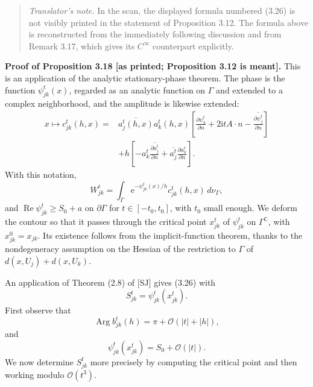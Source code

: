 \documentclass[11pt]{article}
\newcommand{\C}{\mathbb{C}}
\newcommand{\Ree}{\operatorname{Re}}
\newcommand{\Argg}{\operatorname{Arg}}
\newcommand{\OO}{\mathcal O}
\newcommand{\dd}{\,d}
\newcommand{\ii}{\mathrm{i}}
\newcommand{\e}{\mathrm{e}}
\begin{document}
\begin{quote}\small
\textit{Translator's note.} In the scan, the displayed formula numbered (3.26) is not visibly printed in the statement of Proposition 3.12. The formula above is reconstructed from the immediately following discussion and from Remark 3.17, which gives its $C^\infty$ counterpart explicitly.
\end{quote}

\noindent\textbf{Proof of Proposition 3.18 [as printed; Proposition 3.12 is meant].}
This is an application of the analytic stationary-phase theorem. The phase is the function $\psi_{jk}^t(x)$, regarded as an analytic function on $\Gamma$ and extended to a complex neighborhood, and the amplitude is likewise extended:
\begin{align*}
x\longmapsto c_{jk}^t(h,x)
={}&\overline{a_j^t(h,x)}a_k^t(h,x)
\left[
\frac{\partial\psi_k^t}{\partial n}
+2\ii tA\cdot n
-\overline{\frac{\partial\psi_j^t}{\partial n}}
\right]\\
&+h\left[-a_k^t\overline{\frac{\partial a_j^t}{\partial n}}
+\overline{a_j^t}\frac{\partial a_k^t}{\partial n}\right].
\end{align*}
With this notation,
\[
W_{jk}^t=\int_\Gamma \e^{-\psi_{jk}^t(x)/h}
 c_{jk}^t(h,x)\dd\nu_\Gamma,
\]
and $\Ree\psi_{jk}^t\ge S_0+a$ on $\partial\Gamma$ for $t\in[-t_0,t_0]$, with $t_0$ small enough. We deform the contour so that it passes through the critical point $x_{jk}^t$ of $\psi_{jk}^t$ on $\Gamma^{\C}$, with $x_{jk}^0=x_{jk}$. Its existence follows from the implicit-function theorem, thanks to the nondegeneracy assumption on the Hessian of the restriction to $\Gamma$ of
$d(x,U_j)+d(x,U_k)$.

An application of Theorem (2.8) of [SJ] gives (3.26) with
\begin{equation}
S_{jk}^t=\psi_{jk}^t(x_{jk}^t).
\tag{3.27}
\end{equation}
First observe that
\begin{equation}
\Argg b_{jk}^t(h)=\pi+\OO(|t|+|h|),
\tag{3.28}
\end{equation}
and
\begin{equation}
\psi_{jk}^t(x_{jk}^t)=S_0+\OO(|t|).
\tag{3.29}
\end{equation}
We now determine $S_{jk}^t$ more precisely by computing the critical point and then working modulo $\OO(t^3)$.
\end{document}
